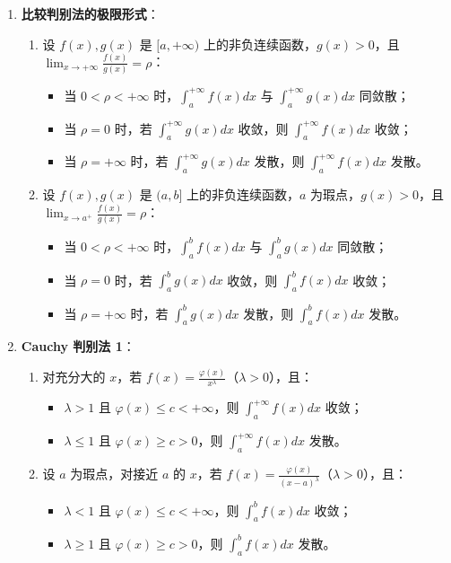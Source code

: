 \documentclass[UTF8]{ctexart}
\theoremstyle{remark}
\begin{document}
\begin{enumerate}
	\item \textbf{比较判别法的极限形式}：
	\begin{enumerate}
		\item 设 \(f(x), g(x)\) 是 \([a, +\infty)\) 上的非负连续函数，\(g(x) > 0\)，且 \(\lim_{x \to +\infty} \frac{f(x)}{g(x)} = \rho\)：
		\begin{itemize}
			\item 当 \(0 < \rho < +\infty\) 时，\(\int_{a}^{+\infty} f(x) dx\) 与 \(\int_{a}^{+\infty} g(x) dx\) 同敛散；
			\item 当 \(\rho = 0\) 时，若 \(\int_{a}^{+\infty} g(x) dx\) 收敛，则 \(\int_{a}^{+\infty} f(x) dx\) 收敛；
			\item 当 \(\rho = +\infty\) 时，若 \(\int_{a}^{+\infty} g(x) dx\) 发散，则 \(\int_{a}^{+\infty} f(x) dx\) 发散。
		\end{itemize}
		\item 设 \(f(x), g(x)\) 是 \((a, b]\) 上的非负连续函数，\(a\) 为瑕点，\(g(x) > 0\)，且 \(\lim_{x \to a^+} \frac{f(x)}{g(x)} = \rho\)：
		\begin{itemize}
			\item 当 \(0 < \rho < +\infty\) 时，\(\int_{a}^{b} f(x) dx\) 与 \(\int_{a}^{b} g(x) dx\) 同敛散；
			\item 当 \(\rho = 0\) 时，若 \(\int_{a}^{b} g(x) dx\) 收敛，则 \(\int_{a}^{b} f(x) dx\) 收敛；
			\item 当 \(\rho = +\infty\) 时，若 \(\int_{a}^{b} g(x) dx\) 发散，则 \(\int_{a}^{b} f(x) dx\) 发散。
		\end{itemize}
	\end{enumerate}
	
	\item \textbf{Cauchy 判别法 1}：
	\begin{enumerate}
		\item 对充分大的 \(x\)，若 \(f(x) = \frac{\varphi(x)}{x^\lambda}\)（\(\lambda > 0\)），且：
		\begin{itemize}
			\item \(\lambda > 1\) 且 \(\varphi(x) \leqslant c < +\infty\)，则 \(\int_{a}^{+\infty} f(x) dx\) 收敛；
			\item \(\lambda \leqslant 1\) 且 \(\varphi(x) \geqslant c > 0\)，则 \(\int_{a}^{+\infty} f(x) dx\) 发散。
		\end{itemize}
		\item 设 \(a\) 为瑕点，对接近 \(a\) 的 \(x\)，若 \(f(x) = \frac{\varphi(x)}{(x-a)^\lambda}\)（\(\lambda > 0\)），且：
		\begin{itemize}
			\item \(\lambda < 1\) 且 \(\varphi(x) \leqslant c < +\infty\)，则 \(\int_{a}^{b} f(x) dx\) 收敛；
			\item \(\lambda \geqslant 1\) 且 \(\varphi(x) \geqslant c > 0\)，则 \(\int_{a}^{b} f(x) dx\) 发散。
		\end{itemize}
	\end{enumerate}
	

\end{enumerate}
\end{document}
